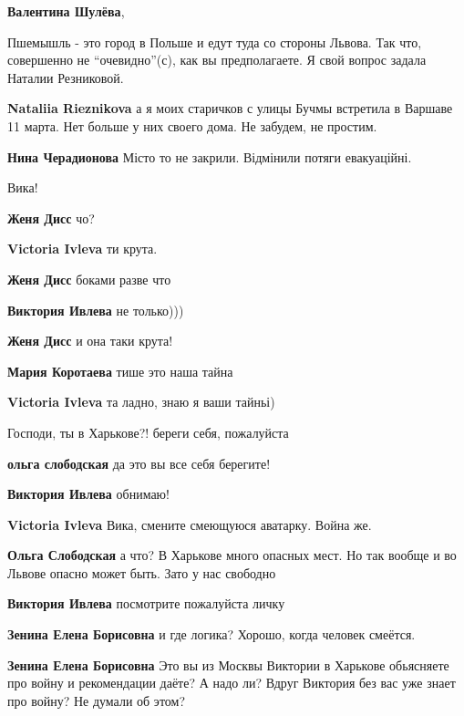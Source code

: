 \begin{itemize}
\begin{itemize}
\textbf{Валентина Шулёва}, 

Пшемышль - это город в Польше и едут туда со стороны Львова. Так что, совершенно
не \enquote{очевидно}(с), как вы предполагаете. Я свой вопрос задала Наталии
Резниковой.

\textbf{Nataliia Rieznikova} а я моих старичков с улицы Бучмы встретила в Варшаве 11 марта. Нет больше у них своего дома. Не забудем, не простим.

\textbf{Нина Черадионова} Місто то не закрили. Відмінили потяги евакуаційні.
\end{itemize} %

Вика!

\begin{itemize} %
\textbf{Женя Дисс} чо?

\textbf{Victoria Ivleva} ти крута.

\textbf{Женя Дисс} боками разве что

\textbf{Виктория Ивлева} не только)))

\textbf{Женя Дисс} и она таки крута!

\textbf{Мария Коротаева} тише это наша тайна

\textbf{Victoria Ivleva} та ладно, знаю я ваши тайньі)
\end{itemize} %

Господи, ты в Харькове?! береги себя, пожалуйста

\begin{itemize} %
\textbf{ольга слободская} да это вы все себя берегите!

\textbf{Виктория Ивлева} обнимаю!

\textbf{Victoria Ivleva}
Вика, смените смеющуюся аватарку. Война же.

\textbf{Ольга Слободская} а что? В Харькове много опасных мест. Но так вообще и во Львове опасно может быть.
Зато у нас свободно

\textbf{Виктория Ивлева} посмотрите пожалуйста личку

\textbf{Зенина Елена Борисовна} и где логика? Хорошо, когда человек смеётся.

\textbf{Зенина Елена Борисовна} Это вы из Москвы Виктории в Харькове обьясняете про войну и рекомендации даёте? А надо ли? Вдруг Виктория без вас уже знает про войну? Не думали об этом?
\end{itemize} %


\end{itemize}
